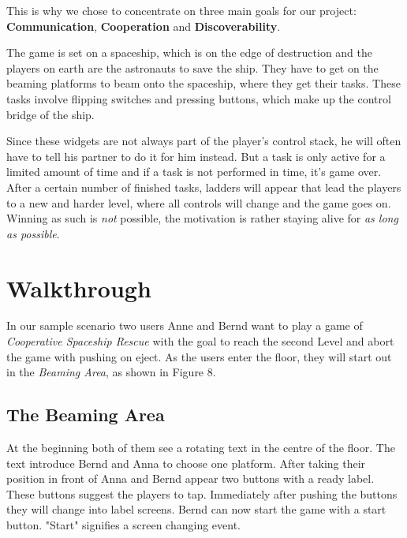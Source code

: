 \documentclass{sigchi}
\begin{document}
This is why we chose to concentrate on three main goals for our project: \textbf{Communication}, \textbf{Cooperation} and \textbf{Discoverability}.



\pagebreak

The game is set on a spaceship, which is on the edge of destruction and the players on earth are the astronauts to save the ship. They have to get on the beaming platforms to beam onto the spaceship, where they get their tasks. These tasks involve flipping switches and pressing buttons, which make up the control bridge of the ship. 

Since these widgets are not always part of the player's control stack, he will often have to tell his partner to do it for him instead. But a task is only active for a limited amount of time and if a task is not performed in time, it's game over. \newline
After a certain number of finished tasks, ladders will appear that lead the players to a new and harder level, where all controls will change and the game goes on. Winning as such is \textit{not} possible, the motivation is rather staying alive for  \textit{as long as possible}.
\section{Walkthrough}
\vspace{1mm}
In our sample scenario two users Anne and Bernd want to play a game of \textit{Cooperative Spaceship Rescue} with the goal to reach the second Level and abort the game with pushing on eject. As the users enter the floor, they will start out in the \textit{Beaming Area}, as shown in Figure 8.

\subsection{The Beaming Area}
\vspace{3mm}
At the beginning both of them see a rotating text in the centre of the floor. The text introduce Bernd and Anna to choose one platform. After taking their position in front of Anna and Bernd appear two buttons with a ready label. These buttons suggest the players to tap. Immediately after pushing the buttons they will change into label screens. Bernd can now start the game with a start button. "Start" signifies a screen changing event.
\end{document}
